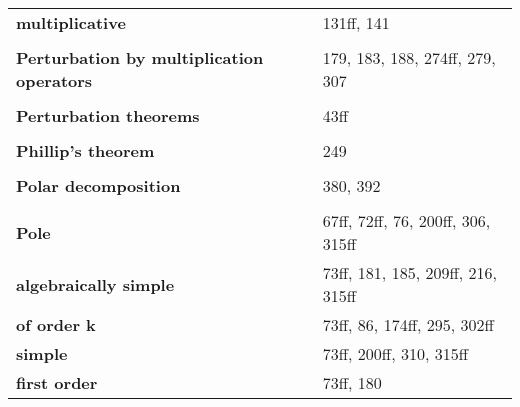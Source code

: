 \documentclass[10pt]{scrartcl}
\begin{document}
\begin{longtable}{>{\bfseries}p{6cm}p{8cm}}
\quad multiplicative & 131ff, 141 \\
\\
\textbf{Perturbation by multiplication operators} & 179, 183, 188, 274ff, 279, 307 \\
\\
\textbf{Perturbation theorems} & 43ff \\
\\
\textbf{Phillip's theorem} & 249 \\
\\
\textbf{Polar decomposition} & 380, 392 \\
\\
\textbf{Pole} & 67ff, 72ff, 76, 200ff, 306, 315ff \\
\quad algebraically simple & 73ff, 181, 185, 209ff, 216, 315ff \\
\quad of order k & 73ff, 86, 174ff, 295, 302ff \\
\quad simple & 73ff, 200ff, 310, 315ff \\
\quad first order & 73ff, 180 \\

\end{longtable}
\end{document}
